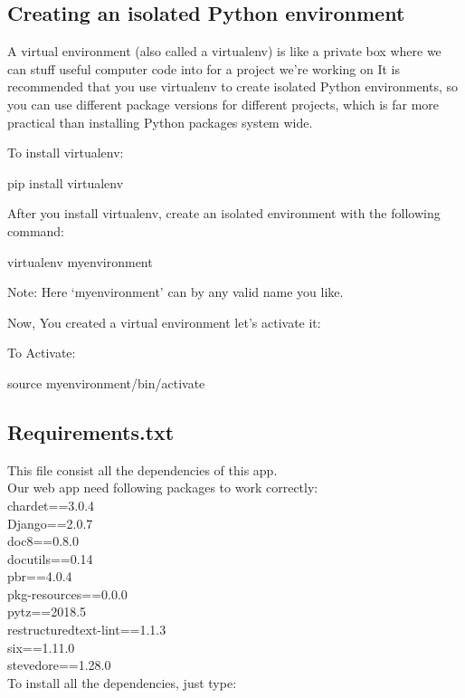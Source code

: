\documentclass[12pt, a4paper, titlepage]{report}
\begin{document}
\subsection{Creating an isolated Python environment}
A virtual environment (also called a virtualenv) is like a private box where we can stuff useful computer code into for a project
we're working on It is recommended that you use virtualenv to create isolated Python environments, so you can use different package versions for different projects, which is far more practical than installing Python packages system wide.

To install virtualenv:
\begin{center}
pip install virtualenv
\end{center}
    

After you install virtualenv, create an isolated environment with the following command:

\begin{center}
virtualenv myenvironment
\end{center}

    

Note: Here `myenvironment' can by any valid name you like.

Now, You created a virtual environment let's activate it:

To Activate:
\begin{center}
source myenvironment/bin/activate
\end{center}

\subsection{Requirements.txt}
This file consist all the dependencies of this app.\\
Our web app need following packages to work correctly:\\
chardet==3.0.4\\
Django==2.0.7\\
doc8==0.8.0\\
docutils==0.14\\
pbr==4.0.4\\
pkg-resources==0.0.0\\
pytz==2018.5\\
restructuredtext-lint==1.1.3\\
six==1.11.0\\
stevedore==1.28.0\\

To install all the dependencies, just type:
\end{document}
